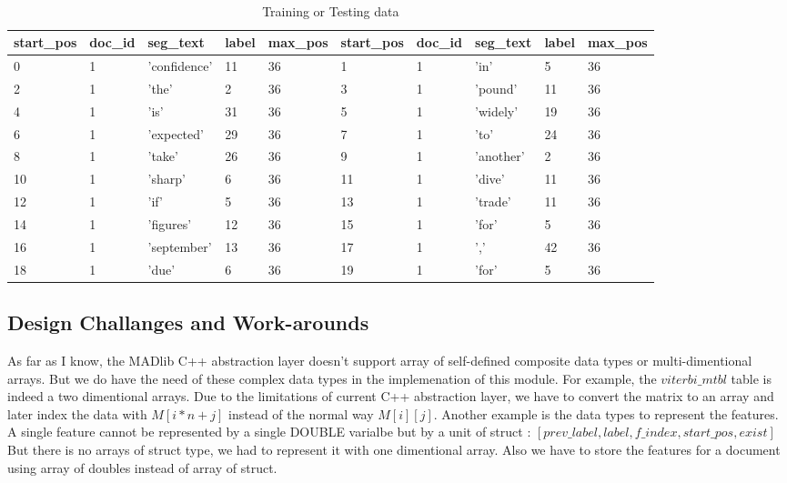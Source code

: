 \begin {table}[h!]
\caption {Training or Testing data} \label{tab:trainingdata} 
\begin{center}
    \footnotesize\tt
\begin{tabular}{lllll||lllll}
  start\_pos & doc\_id & seg\_text & label & max\_pos & start\_pos & doc\_id & seg\_text & label & max\_pos\\
  \hline                        
        0&1&'confidence'&11&36& 1&1&'in'&5&36\\ 
        2&1&'the'&2&36& 3&1&'pound'&11&36\\
        4&1&'is'&31&36& 5&1&'widely'&19&36\\ 
        6&1&'expected'&29&36& 7&1&'to'&24&36\\
        8&1&'take'&26&36& 9&1&'another'&2&36\\
        10&1&'sharp'&6&36& 11&1&'dive'&11&36\\
        12&1&'if'&5&36& 13&1&'trade'&11&36\\
        14&1&'figures'&12&36& 15&1&'for'&5&36\\
        16&1&'september'&13&36& 17&1&','&42&36\\ 
        18&1&'due'&6&36& 19&1&'for'&5&36\\\hline  
\end{tabular}
\end{center}
\end{table}

\subsection{Design Challanges and Work-arounds}
As far as I know, the MADlib C++ abstraction layer doesn't support array of self-defined composite data types or multi-dimentional arrays.
But we do have the need of these complex data types in the implemenation of this module. For example, the 
$viterbi\_mtbl$ table is indeed a two dimentional arrays. Due to the limitations of current C++ abstraction layer, we have to convert the matrix 
to an array and later index the data with  $M[i*n+j]$ instead of the normal way $M[i][j]$. Another example is the data types to represent the 
features. A single feature cannot be represented by a single DOUBLE varialbe but by a unit of struct : $[prev\_label, label, f\_index, start\_pos, exist]$  
But there is no arrays of struct type, we had to represent it with one dimentional array. 
Also we have to store the features for a document using  array of doubles instead of array of struct. 


